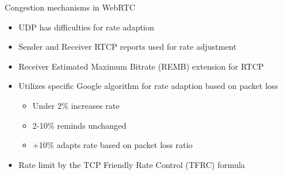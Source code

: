 \documentclass[first=red,second=purple,logo=yellowexc]{aaltoslides}
\begin{document}
\begin{frame}{Congestion mechanisms in WebRTC}

\begin{itemize}
\item UDP has difficulties for rate adaption 
\item Sender and Receiver RTCP reports used for rate adjustment
\item Receiver Estimated Maximum Bitrate (REMB) extension for RTCP
\item Utilizes specific {\color{red}Google algorithm} for rate adaption based on packet loss
\begin{itemize}
\item Under 2\% increases rate
\item 2-10\% reminds unchanged
\item +10\% adapts rate based on packet loss ratio
\end{itemize}
\item Rate limit by the TCP Friendly Rate Control (TFRC) formula
\end{itemize}
\end{frame}
\end{document}
